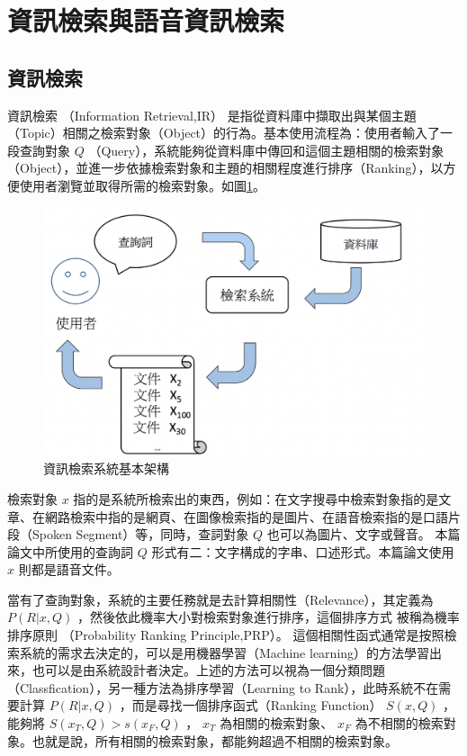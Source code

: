 \section{資訊檢索與語音資訊檢索}

\subsection{資訊檢索}


資訊檢索 （Information Retrieval,IR）
是指從資料庫中擷取出與某個主題（Topic）相關之檢索對象（Object）的行為。基本使用流程為：使用者輸入了一段查詢對象 $ Q $ （Query），系統能夠從資料庫中傳回和這個主題相關的檢索對象（Object），並進一步依據檢索對象和主題的相關程度進行排序（Ranking），以方便使用者瀏覽並取得所需的檢索對象。如圖\ref{fig:ch2_IR}。
\begin{figure}
\centering
\includegraphics[scale=0.4]{images/ch2_Ir.png}
\caption{資訊檢索系統基本架構} \label{fig:ch2_IR}
\end{figure}

檢索對象  $ x $ 
指的是系統所檢索出的東西，例如：在文字搜尋中檢索對象指的是文章、在網路檢索中指的是網頁、在圖像檢索指的是圖片、在語音檢索指的是口語片段（Spoken Segment）等，同時，查詞對象  $ Q $  也可以為圖片、文字或聲音。
本篇論文中所使用的查詢詞  $ Q $  形式有二：文字構成的字串、口述形式。本篇論文使用  $ x $  則都是語音文件。

當有了查詢對象，系統的主要任務就是去計算相關性（Relevance），其定義為  $ P(R|x,Q) $  ，然後依此機率大小對檢索對象進行排序，這個排序方式
被稱為機率排序原則 （Probability Ranking Principle,PRP）\cite{robertson1997probability}。
這個相關性函式通常是按照檢索系統的需求去決定的，可以是用機器學習（Machine
learning）的方法學習出來，也可以是由系統設計者決定。上述的方法可以視為一個分類問題（Classfication），另一種方法為排序學習（Learning
to Rank），此時系統不在需要計算  $ P(R|x,Q) $ ，而是尋找一個排序函式（Ranking Function）
 $ S(x,Q) $ ，能夠將 $  S(x_T,Q)>s(x_F,Q) $ ，  $ x_T $  為相關的檢索對象、  $ x_F $ 
為不相關的檢索對象。也就是說，所有相關的檢索對象，都能夠超過不相關的檢索對象。

